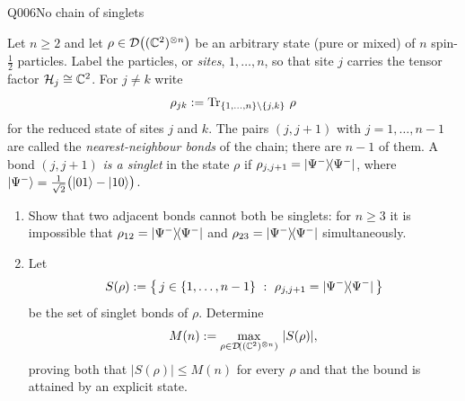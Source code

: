 \begin{entry}{Q006}{No chain of singlets}


\begin{problem}
Let $n\ge 2$ and let $\rho\in\mathcal{D}\!\left((\mathbb{C}^{2})^{\otimes n}\right)$ be an arbitrary state (pure or
mixed) of $n$ spin-$\tfrac12$ particles. Label the particles, or \emph{sites},
$1,\dots,n$, so that site $j$ carries the tensor factor $\mathcal H_j\cong\mathbb{C}^{2}$.
For $j\neq k$ write
\[
  \rho_{jk}:=\operatorname{Tr}_{\{1,\dots,n\}\setminus\{j,k\}}\,\rho
\]
for the reduced state of sites $j$ and $k$. The pairs $(j,j+1)$ with
$j=1,\dots,n-1$ are called the \emph{nearest-neighbour bonds} of the chain; there are
$n-1$ of them. A bond $(j,j+1)$ \emph{is a singlet} in the state $\rho$ if
$\rho_{j,j+1}=\lvert \Psi^{-} \rangle\!\langle \Psi^{-} \rvert$, where
$\lvert \Psi^{-} \rangle=\tfrac{1}{\sqrt{2}}\bigl(\lvert 01 \rangle-\lvert 10 \rangle\bigr)$.

\begin{enumerate}[label=\textbf{(\alph*)},leftmargin=*]
  \item Show that two adjacent bonds cannot both be singlets: for $n\ge 3$ it is
        impossible that $\rho_{12}=\lvert \Psi^{-} \rangle\!\langle \Psi^{-} \rvert$ and $\rho_{23}=\lvert \Psi^{-} \rangle\!\langle \Psi^{-} \rvert$
        simultaneously.
  \item Let
        \[
          S(\rho):=\bigl\{\,j\in\{1,\dots,n-1\}\ :\ \rho_{j,j+1}=\proj{\Psi^{-}}\,\bigr\}
        \]
        be the set of singlet bonds of $\rho$. Determine
        \[
          M(n):=\max_{\rho\in\Dop{(\CC^{2})^{\otimes n}}}\ \lvert S(\rho)\rvert ,
        \]
        proving both that $\lvert S(\rho)\rvert\le M(n)$ for every $\rho$ and that the
        bound is attained by an explicit state.
\end{enumerate}
\end{problem}



\end{entry}
